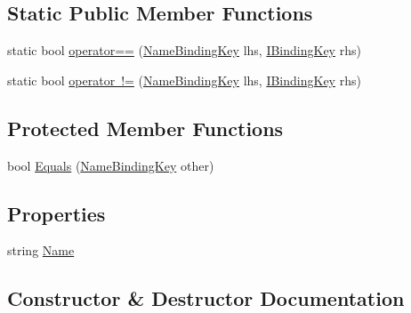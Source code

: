 \subsection*{Static Public Member Functions}
\begin{DoxyCompactItemize}
\item 
static bool \mbox{\hyperlink{classcp_games_1_1core_1_1_rapid_m_v_c_1_1impl_1_1_name_binding_key_a6526fd3bf07b398472e5315ccef50891}{operator==}} (\mbox{\hyperlink{classcp_games_1_1core_1_1_rapid_m_v_c_1_1impl_1_1_name_binding_key}{Name\+Binding\+Key}} lhs, \mbox{\hyperlink{interfacecp_games_1_1core_1_1_rapid_m_v_c_1_1_i_binding_key}{I\+Binding\+Key}} rhs)
\item 
static bool \mbox{\hyperlink{classcp_games_1_1core_1_1_rapid_m_v_c_1_1impl_1_1_name_binding_key_aa731579a1b71278b9b51f83a16782cad}{operator !=}} (\mbox{\hyperlink{classcp_games_1_1core_1_1_rapid_m_v_c_1_1impl_1_1_name_binding_key}{Name\+Binding\+Key}} lhs, \mbox{\hyperlink{interfacecp_games_1_1core_1_1_rapid_m_v_c_1_1_i_binding_key}{I\+Binding\+Key}} rhs)
\end{DoxyCompactItemize}
\subsection*{Protected Member Functions}
\begin{DoxyCompactItemize}
\item 
bool \mbox{\hyperlink{classcp_games_1_1core_1_1_rapid_m_v_c_1_1impl_1_1_name_binding_key_ab888c3e48bc20e7d665ed590d946b80a}{Equals}} (\mbox{\hyperlink{classcp_games_1_1core_1_1_rapid_m_v_c_1_1impl_1_1_name_binding_key}{Name\+Binding\+Key}} other)
\end{DoxyCompactItemize}
\subsection*{Properties}
\begin{DoxyCompactItemize}
\item 
string \mbox{\hyperlink{classcp_games_1_1core_1_1_rapid_m_v_c_1_1impl_1_1_name_binding_key_a844aa34461f42cbc7b77ab9505bdef12}{Name}}
\end{DoxyCompactItemize}


\subsection{Constructor \& Destructor Documentation}
\mbox{\label{classcp_games_1_1core_1_1_rapid_m_v_c_1_1impl_1_1_name_binding_key_aee1ce8777d8fa0de47a8d878966c5359}} 
